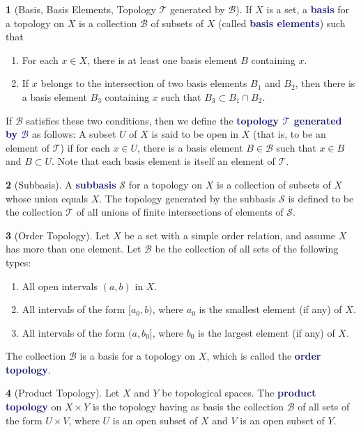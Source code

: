 \documentclass[12pt]{article}
\newcommand{\navy}[1]{\textcolor{MidnightBlue}{\bf #1}}
\theoremstyle{plain}
\theoremstyle{definition}
\newtheorem{definition}{\color{MidnightBlue}{\textbf{Definition}}}[section]
\newcommand{\1}{\mathbbm 1}
\newcommand{\sS}{\mathscr S}
\newcommand{\tT}{\mathcal T}
\newcommand{\bB}{\mathcal B}
\begin{document}
\begin{definition}[Basis, Basis Elements, Topology $\tT$ generated by $\bB$]
If $X$ is a set, a \navy{basis} for a topology on $X$ is a collection $\bB$ of subsets of $X$ (called \navy{basis elements}) such that
\begin{enumerate}
\item For each $x \in X$, there is at least one basis element $B$ containing $x$.
\item If $x$ belongs to the intersection of two basis elements $B_1$ and $B_2$, then there is a basis element $B_3$ containing $x$ such that $B_3 \subset B_1 \cap B_2$.
\end{enumerate}
If $\bB$ satisfies these two conditions, then we define the \navy{topology $\tT$ generated by $\bB$} as follows: A subset $U$ of $X$ is said to be open in $X$ (that is, to be an element of $\tT$) if for each $x \in U$, there is a basis element $B \in \bB$ such that $x \in B$ and $B \subset U$. Note that each basis element is itself an element of $\tT$.
\end{definition}

\begin{definition}[Subbasis]
A \navy{subbasis} $\sS$ for a topology on $X$ is a collection of subsets of $X$ whose union equals $X$. The topology generated by the subbasis $\sS$ is defined to be the collection $\tT$ of all unions of finite intersections of elements of $\sS$.
\end{definition}

\begin{definition}[Order Topology]
Let $X$ be a set with a simple order relation, and assume $X$ has more than one element. Let $\bB$ be the collection of all sets of the following types:
\begin{enumerate}
\item All open intervals $(a,b)$ in $X$.
\item All intervals of the form $[a_0, b)$, where $a_0$ is the smallest element (if any) of $X$.
\item All intervals of the form $(a,b_0]$, where $b_0$ is the largest element (if any) of $X$.
\end{enumerate}
The collection $\bB$ is a basis for a topology on $X$, which is called the \navy{order topology}.
\end{definition}

\begin{definition}[Product Topology]
Let $X$ and $Y$ be topological spaces. The \navy{product topology} on $X \times Y$ is the topology having as basis the collection $\bB$ of all sets of the form $U \times V$, where $U$ is an open subset of $X$ and $V$ is an open subset of $Y$.
\end{definition}
\end{document}

